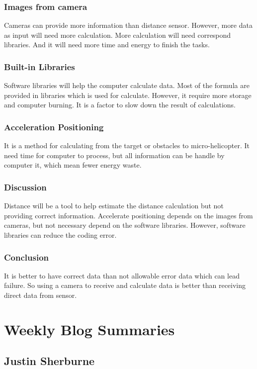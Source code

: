 \documentclass[onecolumn, draftclsnofoot,10pt, compsoc]{IEEEtran}
\begin{document}
\subsubsection{Images from camera}
Cameras can provide more information than distance sensor. However, more data as input will need more calculation. More calculation will need correspond libraries. And it will need more time and energy to finish the tasks.

\subsubsection{Built-in Libraries}
Software libraries will help the computer calculate data. Most of the formula are provided in libraries which is used for calculate. However, it require more storage and computer burning. It is a factor to slow down the result of calculations.

\subsubsection{Acceleration Positioning}
It is a method for calculating from the target or obstacles to micro-helicopter. It need time for computer to process, but all information can be handle by computer it, which mean fewer energy waste.

\subsubsection{Discussion}
Distance will be a tool to help estimate the distance calculation but not providing correct information. Accelerate positioning depends on the images from cameras, but not necessary depend on the software libraries. However, software libraries can reduce the coding error.

\subsubsection{Conclusion}
It is better to have correct data than not allowable error data which can lead failure. So using a camera to receive and calculate data is better than receiving direct data from sensor.

\newpage

\section{Weekly Blog Summaries}
\subsection{Justin Sherburne}
\end{document}
